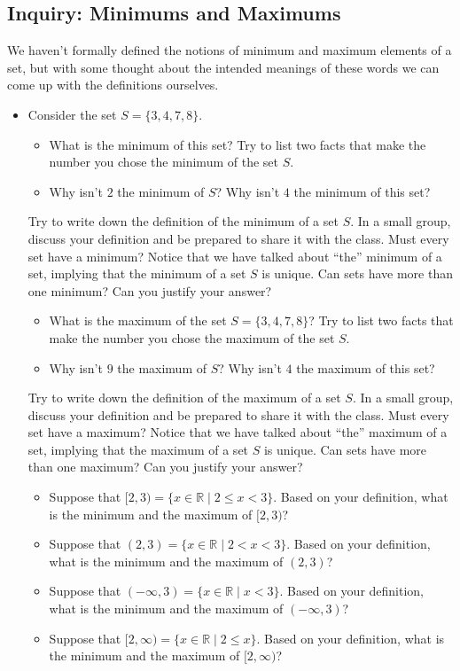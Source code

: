 \documentclass[11pt]{article}
\newenvironment{task}
	{\begin{mdframed}[linecolor=lightgray, linewidth=3pt]\raggedright}
	{\end{mdframed}}
\theoremstyle{definition}
\begin{document}
\subsection{Inquiry: Minimums and Maximums}
\begin{task}
  We haven't formally defined the notions of minimum and maximum elements of a set, but with some thought about the 
  intended meanings of these words we can come up with the definitions ourselves.
  \begin{itemize}
    \item Consider the set $S=\{3, 4, 7, 8 \}$. 
      \begin{itemize}
        \item What is the minimum of this set? Try to list two facts that make the number you chose the minimum of the set $S$.
        \item Why isn't $2$ the minimum of $S$? Why isn't $4$ the minimum of this set?
      \end{itemize}
      Try to write down the definition of the minimum of a set $S$. In a small group, discuss your definition and be prepared to share it
      with the class. Must every set have a minimum? Notice that we have talked about ``the'' minimum of a set, implying that the minimum 
      of a set $S$ is unique. Can sets have more than one minimum? Can you justify your answer?
      \begin{itemize}
        \item What is the maximum of the set $S=\{3,4,7,8\}$? Try to list two facts that make the number you chose the maximum of the set $S$.
        \item Why isn't $9$ the maximum of $S$? Why isn't $4$ the maximum of this set?
      \end{itemize}
      Try to write down the definition of the maximum of a set $S$. In a small group, discuss your definition and be prepared to share it
      with the class. Must every set have a maximum? Notice that we have talked about ``the'' maximum of a set, implying that the maximum 
      of a set $S$ is unique. Can sets have more than one maximum? Can you justify your answer?
      \begin{itemize}
        \item Suppose that $[2,3) = \{ x \in\mathbb{R} \mid 2\leq x < 3\}$. Based on your definition, what is the minimum and the maximum of $[2,3)$?
        \item Suppose that $(2,3) = \{ x \in\mathbb{R} \mid 2 < x < 3\}$. Based on your definition, what is the minimum and the maximum of $(2,3)$?
        \item Suppose that $(-\infty,3) = \{ x \in\mathbb{R} \mid x < 3\}$. Based on your definition, what is the minimum and the maximum of $(-\infty,3)$?
        \item Suppose that $[2,\infty) = \{ x \in\mathbb{R} \mid 2\leq x \}$. Based on your definition, what is the minimum and the maximum of $[2,\infty)$?
      \end{itemize}
  \end{itemize}
\end{task}\newpage
\end{document}
